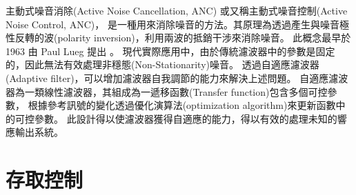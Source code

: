     主動式噪音消除(Active Noise Cancellation, ANC) 或又稱主動式噪音控制(Active Noise Control, ANC)，
是一種用來消除噪音的方法。其原理為透過產生與噪音極性反轉的波(polarity inversion)，利用兩波的抵銷干涉來消除噪音。
此概念最早於 1963 由 Paul Lueg 提出 \cite{elliott1993active}。
現代實際應用中，由於傳統濾波器中的參數是固定的，因此無法有效處理非穩態(Non-Stationarity)噪音。
透過自適應濾波器(Adaptive filter)，可以增加濾波器自我調節的能力來解決上述問題。
自適應濾波器為一類線性濾波器，其組成為一遞移函數(Transfer function)包含多個可控參數，
根據參考訊號的變化透過優化演算法(optimization algorithm)來更新函數中的可控參數。
此設計得以使濾波器獲得自適應的能力，得以有效的處理未知的響應輸出系統\cite{widrow1983adaptive}。


\section{存取控制}